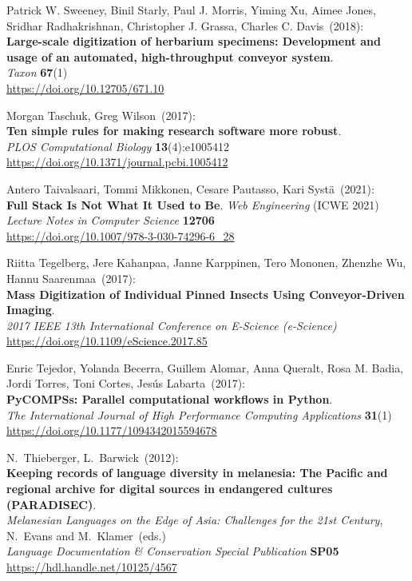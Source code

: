 \begin{thebibliography}{9}
Patrick W. Sweeney, Binil Starly, Paul J. Morris, Yiming Xu, Aimee Jones, Sridhar Radhakrishnan, Christopher J. Grassa, Charles C. Davis~(2018): \\
\textbf{Large-scale digitization of herbarium specimens: Development and usage of an automated, high-throughput conveyor system}.\\
\emph{Taxon} \textbf{67}(1)\\
\url{https://doi.org/10.12705/671.10}

Morgan Taschuk, Greg Wilson~(2017):\\
\textbf{Ten simple rules for making research software more robust}.\\
\emph{PLOS Computational Biology} \textbf{13}(4):e1005412\\
\url{https://doi.org/10.1371/journal.pcbi.1005412}

Antero Taivalsaari, Tommi Mikkonen, Cesare Pautasso, Kari Systä~(2021): \\
\textbf{Full Stack Is Not What It Used to Be}.
\emph{Web Engineering} (ICWE 2021)\\
\emph{Lecture Notes in Computer Science} \textbf{12706} \\
\url{https://doi.org/10.1007/978-3-030-74296-6_28}

Riitta Tegelberg, Jere Kahanpaa, Janne Karppinen, Tero Mononen, Zhenzhe Wu, Hannu Saarenmaa~(2017): \\
\textbf{Mass Digitization of Individual Pinned Insects Using Conveyor-Driven Imaging}.\\
\emph{2017 IEEE 13th International Conference on E-Science (e-Science)}\\
\url{https://doi.org/10.1109/eScience.2017.85}

Enric Tejedor, Yolanda Becerra, Guillem Alomar, Anna Queralt, Rosa M. Badia, Jordi Torres, Toni Cortes, Jesús Labarta~(2017): \\
\textbf{PyCOMPSs: Parallel computational workflows in Python}.\\
\emph{The International Journal of High Performance Computing Applications}
\textbf{31}(1) \\
\url{https://doi.org/10.1177/1094342015594678}

N.~Thieberger, L.~Barwick~(2012): \\
\textbf{Keeping records of language diversity in melanesia: The Pacific and regional archive for digital sources in endangered cultures (PARADISEC)}.\\
\emph{Melanesian Languages on the Edge of Asia: Challenges for the 21st Century}, N.~Evans and M.~Klamer~(eds.)\\
\emph{Language Documentation \& Conservation Special Publication}
\textbf{SP05} \\
\url{https://hdl.handle.net/10125/4567}


\end{thebibliography}
